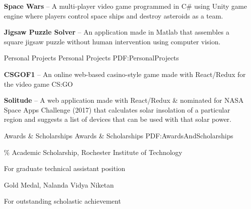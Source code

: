 \documentclass[letterpaper,MMMyyyy,nonstopmode]{simpleresumecv}
\begin{document}
\begin{Body}
\Gap

\BulletItem
\textbf{Space Wars} -- A multi-player video game programmed in C\# using Unity game engine where players control space ships and destroy asteroids as a team.

\Gap

\BulletItem
\textbf{Jigsaw Puzzle Solver} -- An application made in Matlab that assembles a square jigsaw puzzle without human intervention using computer vision.




\Section
{Personal \newline
Projects}
{Personal Projects}
{PDF:PersonalProjects}

\BulletItem
\textbf{CSGOF1} -- An online web-based casino-style game made with React/Redux for the video game CS:GO
\Gap

\BulletItem
\textbf{Solitude} -- A web application made with React/Redux \& nominated for NASA Space Apps Challenge (2017) that calculates solar insolation of a particular region and suggests a list of devices that can be used with that solar power.




\Section
{Awards \&\newline
Scholarships}
{Awards \& Scholarships}
{PDF:AwardsAndScholarships}

\% Academic Scholarship,
Rochester Institute of Technology
\begin{Detail}
\Item
For graduate technical assistant position
\end{Detail}

\Gap

\BulletItem
Gold Medal,
Nalanda Vidya Niketan
\begin{Detail}
\Item
For outstanding scholastic achievement
\end{Detail}
\end{Body}
\end{document}
